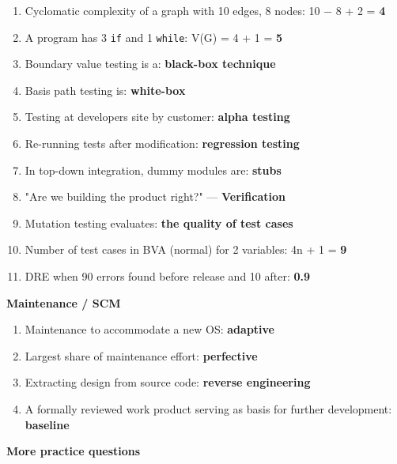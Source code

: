 \begin{enumerate}
\def\labelenumi{\arabic{enumi}.}
\setcounter{enumi}{35}
\tightlist
\item
  Cyclomatic complexity of a graph with 10 edges, 8 nodes: 10 − 8 + 2 = \textbf{4}
\item
  A program has 3 \texttt{if} and 1 \texttt{while}: V(G) = 4 + 1 = \textbf{5}
\item
  Boundary value testing is a: \textbf{black-box technique}
\item
  Basis path testing is: \textbf{white-box}
\item
  Testing at developer\textquotesingle s site by customer: \textbf{alpha testing}
\item
  Re-running tests after modification: \textbf{regression testing}
\item
  In top-down integration, dummy modules are: \textbf{stubs}
\item
  "Are we building the product right?" --- \textbf{Verification}
\item
  Mutation testing evaluates: \textbf{the quality of test cases}
\item
  Number of test cases in BVA (normal) for 2 variables: 4n + 1 = \textbf{9}
\item
  DRE when 90 errors found before release and 10 after: \textbf{0.9}
\end{enumerate}

\textbf{Maintenance / SCM}

\begin{enumerate}
\def\labelenumi{\arabic{enumi}.}
\setcounter{enumi}{46}
\tightlist
\item
  Maintenance to accommodate a new OS: \textbf{adaptive}
\item
  Largest share of maintenance effort: \textbf{perfective}
\item
  Extracting design from source code: \textbf{reverse engineering}
\item
  A formally reviewed work product serving as basis for further development: \textbf{baseline}
\end{enumerate}

\textbf{More practice questions}

